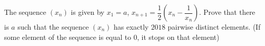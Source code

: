 The sequence $(x_n)$ is given by $x_1=a$,  $x_{n+1}=\dfrac{1}{2}\left(x_n-\dfrac{1}{x_n}\right)$. Prove that there is $a$ such that the sequence $(x_n)$ has exactly $2018$ pairwise distinct elements. (If some element of the sequence is equal to $0$,  it stops on that element)
